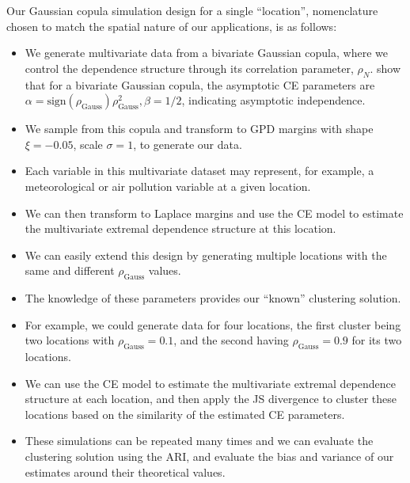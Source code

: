\documentclass{article}
\numberwithin{equation}{section}
\begin{document}
Our Gaussian copula simulation design for a single ``location'', nomenclature chosen to match the spatial nature of our applications, is as follows:
\begin{itemize}
  \item We generate multivariate data from a bivariate Gaussian copula, where we control the dependence structure through its correlation parameter, $\rho_{N}$. 
    \cite{Keef2013} show that for a bivariate Gaussian copula, the asymptotic CE parameters are $\alpha = \text{sign}(\rho_{\text{Gauss}}) \rho_{\text{Gauss}}^2, \beta = 1/2$, indicating asymptotic independence. 
  \item We sample from this copula and transform to GPD margins with shape $\xi = -0.05$, scale $\sigma = 1$, to generate our data. 
  \item Each variable in this multivariate dataset may represent, for example, a meteorological or air pollution variable at a given location.
  \item We can then transform to Laplace margins and use the CE model to estimate the multivariate extremal dependence structure at this location.
\end{itemize}

\vspace{1cm}

\begin{itemize}
  \item We can easily extend this design by generating multiple locations with the same and different $\rho_{\text{Gauss}}$ values.
  \item The knowledge of these parameters provides our ``known'' clustering solution.
  \item For example, we could generate data for four locations, the first cluster being two locations with $\rho_{\text{Gauss}} = 0.1$, and the second having $\rho_{\text{Gauss}} = 0.9$ for its two locations.
  \item We can use the CE model to estimate the multivariate extremal dependence structure at each location, and then apply the JS divergence to cluster these locations based on the similarity of the estimated CE parameters. 
  \item These simulations can be repeated many times and we can evaluate the clustering solution using the ARI, and evaluate the bias and variance of our estimates around their theoretical values.
\end{itemize}
\end{document}
